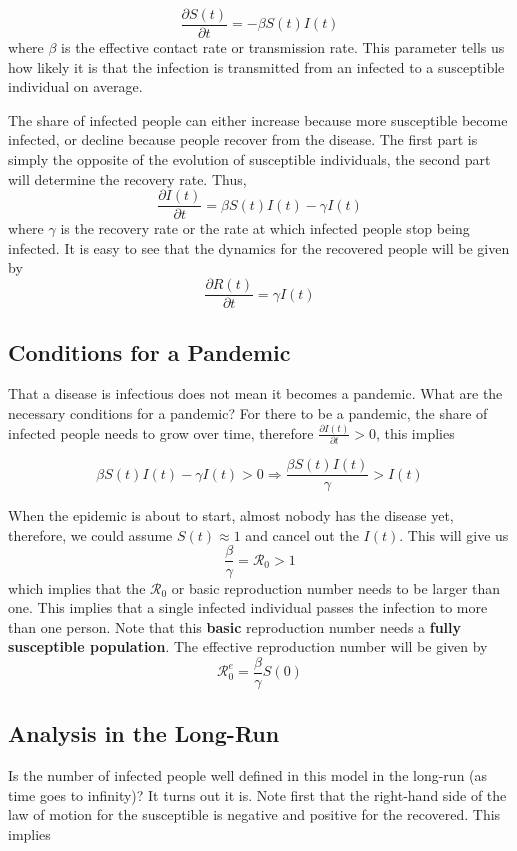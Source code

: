 \documentclass[a4paper,11pt]{article}
\theoremstyle{definition}
\theoremstyle{plain}
\begin{document}
\[
\frac{\partial S(t)}{\partial t} = - \beta S(t)I(t)
\] 
where \(\beta\) is the effective contact rate or transmission rate. This parameter tells us how likely it is that the infection is transmitted from an infected to a susceptible individual on average.

The share of infected people can either increase because more susceptible become infected, or decline because people recover from the disease. The first part is simply the opposite of the evolution of susceptible individuals, the second part will determine the recovery rate. Thus, 
\[
\frac{\partial I(t)}{\partial t} = \beta S(t)I(t) - \gamma I(t)
\] 
where \(\gamma\) is the recovery rate or the rate at which infected people stop being infected. It is easy to see that the dynamics for the recovered people will be given by 
\[
\frac{\partial R(t)}{\partial t} = \gamma I(t)
\]

\subsection{Conditions for a Pandemic}\label{conditions-for-a-pandemic}
That a disease is infectious does not mean it becomes a pandemic. What
are the necessary conditions for a pandemic? For there to be a pandemic, the share of infected people needs to grow over time, therefore \(\frac{\partial I(t)}{\partial t} > 0\), this implies

\[ 
\beta S(t)I(t) - \gamma I(t) > 0 \Rightarrow \frac{\beta S(t)I(t)}{\gamma} > I(t)
\] 

When the epidemic is about to start, almost nobody has the disease yet, therefore, we could assume \(S(t) \approx 1\) and cancel out the \(I(t)\). This will give us
\[
\frac{\beta}{\gamma} = \mathcal{R}_0 > 1
\] 
which implies that the \(\mathcal{R}_0\) or basic reproduction number
needs to be larger than one. This implies that a single infected individual passes the infection to more than one person. Note that this
\textbf{basic} reproduction number needs a \textbf{fully susceptible
population}. The effective reproduction number will be given by \[
\mathcal{R}^e_0 = \frac{\beta}{\gamma}S(0)
\]

\subsection{Analysis in the Long-Run}\label{analysis-in-the-long-run}
Is the number of infected people well defined in this model in the
long-run (as time goes to infinity)? It turns out it is. Note first that the right-hand side of the law of motion for the susceptible is negative and positive for the recovered. This implies
\end{document}

